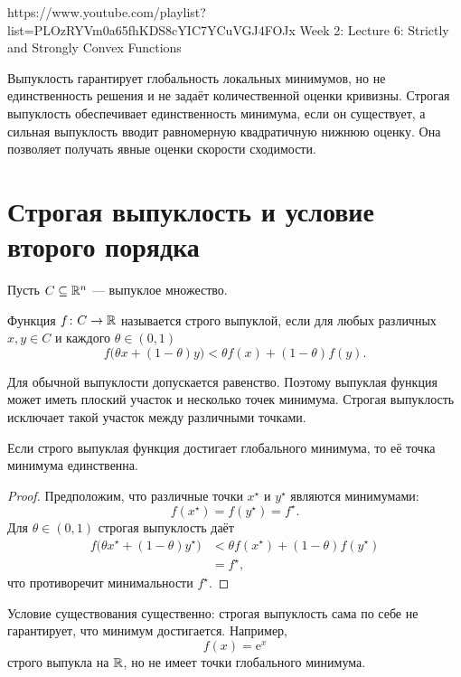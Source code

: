 
\sourcevideo
    {https://www.youtube.com/playlist?list=PLOzRYVm0a65fhKDS8cYIC7YCuVGJ4FOJx}
    {Week 2: Lecture 6: Strictly and Strongly Convex Functions}

Выпуклость гарантирует глобальность локальных минимумов, но не
единственность решения и не задаёт количественной оценки кривизны.
Строгая выпуклость обеспечивает единственность минимума, если он
существует, а сильная выпуклость вводит равномерную квадратичную
нижнюю оценку. Она позволяет получать явные оценки скорости
сходимости.

\section{Строгая выпуклость и условие второго порядка}

Пусть \(C\subseteq\mathbb{R}^n\) --- выпуклое множество.

\begin{definition}
Функция \(f\colon C\to\mathbb{R}\) называется строго выпуклой, если для
любых различных \(x,y\in C\) и каждого \(\theta\in(0,1)\)
\[
    f\bigl(\theta x+(1-\theta)y\bigr)
    <
    \theta f(x)+(1-\theta)f(y).
\]
\end{definition}

Для обычной выпуклости допускается равенство. Поэтому выпуклая
функция может иметь плоский участок и несколько точек минимума.
Строгая выпуклость исключает такой участок между различными точками.

\begin{theorem}
Если строго выпуклая функция достигает глобального минимума, то её
точка минимума единственна.
\end{theorem}

\begin{proof}
Предположим, что различные точки \(x^\star\) и \(y^\star\) являются
минимумами:
\[
    f(x^\star)=f(y^\star)=f^\star.
\]
Для \(\theta\in(0,1)\) строгая выпуклость даёт
\[
\begin{aligned}
    f\bigl(\theta x^\star+(1-\theta)y^\star\bigr)
    &<
    \theta f(x^\star)+(1-\theta)f(y^\star)
    \\
    &=f^\star,
\end{aligned}
\]
что противоречит минимальности \(f^\star\).
\end{proof}

Условие существования существенно: строгая выпуклость сама по себе
не гарантирует, что минимум достигается. Например,
\[
    f(x)=\mathrm{e}^x
\]
строго выпукла на \(\mathbb{R}\), но не имеет точки глобального минимума.



